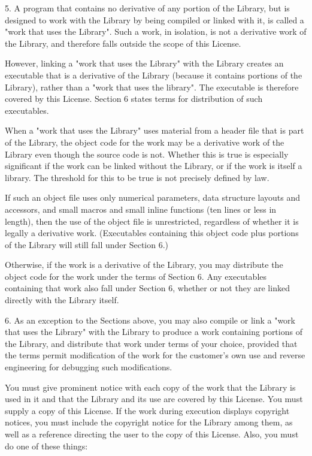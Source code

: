 \documentclass[twoside]{tceusermanual}
\begin{document}
5. A program that contains no derivative of any portion of the
Library, but is designed to work with the Library by being
compiled or linked with it, is called a "work that uses the
Library".  Such a work, in isolation, is not a derivative work
of the Library, and therefore falls outside the scope of this
License.

However, linking a "work that uses the Library" with the Library
creates an executable that is a derivative of the Library
(because it contains portions of the Library), rather than a
"work that uses the library".  The executable is therefore
covered by this License. Section 6 states terms for distribution
of such executables.

When a "work that uses the Library" uses material from a header
file that is part of the Library, the object code for the work
may be a derivative work of the Library even though the source
code is not. Whether this is true is especially significant if
the work can be linked without the Library, or if the work is
itself a library.  The threshold for this to be true is not
precisely defined by law.

If such an object file uses only numerical parameters, data
structure layouts and accessors, and small macros and small
inline functions (ten lines or less in length), then the use of
the object file is unrestricted, regardless of whether it is
legally a derivative work.  (Executables containing this object
code plus portions of the Library will still fall under Section
6.)

Otherwise, if the work is a derivative of the Library, you may
distribute the object code for the work under the terms of
Section 6. Any executables containing that work also fall under
Section 6, whether or not they are linked directly with the
Library itself.
 
6. As an exception to the Sections above, you may also compile
or link a "work that uses the Library" with the Library to
produce a work containing portions of the Library, and
distribute that work under terms of your choice, provided that
the terms permit modification of the work for the customer's own
use and reverse engineering for debugging such modifications.

You must give prominent notice with each copy of the work that
the Library is used in it and that the Library and its use are
covered by this License.  You must supply a copy of this
License.  If the work during execution displays copyright
notices, you must include the copyright notice for the Library
among them, as well as a reference directing the user to the
copy of this License.  Also, you must do one of these things:
\end{document}
